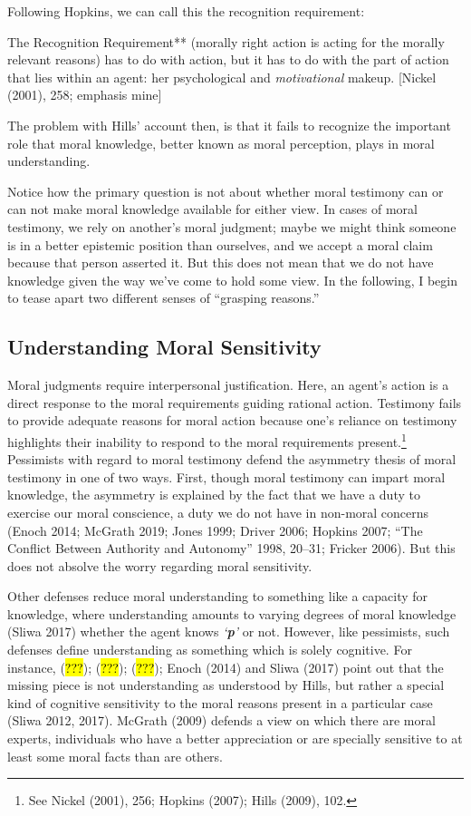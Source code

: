 \documentclass[
  letterpaper,
  DIV=11,
  numbers=noendperiod]{scrartcl}
\theoremstyle{remark}
\begin{document}
Following Hopkins, we can call this the recognition requirement:

The Recognition Requirement** (morally right action is acting for the
morally relevant reasons) has to do with action, but it has to do with
the part of action that lies within an agent: her psychological and
\emph{motivational} makeup. {[}Nickel (2001), 258; emphasis mine{]}

The problem with Hills' account then, is that it fails to recognize the
important role that moral knowledge, better known as moral perception,
plays in moral understanding.

Notice how the primary question is not about whether moral testimony can
or can not make moral knowledge available for either view. In cases of
moral testimony, we rely on another's moral judgment; maybe we might
think someone is in a better epistemic position than ourselves, and we
accept a moral claim because that person asserted it. But this does not
mean that we do not have knowledge given the way we've come to hold some
view. In the following, I begin to tease apart two different senses of
``grasping reasons.''

\subsection{Understanding Moral
Sensitivity}\label{understanding-moral-sensitivity}

Moral judgments require interpersonal justification. Here, an agent's
action is a direct response to the moral requirements guiding rational
action. Testimony fails to provide adequate reasons for moral action
because one's reliance on testimony highlights their inability to
respond to the moral requirements present.\footnote{See Nickel (2001),
  256; Hopkins (2007); Hills (2009), 102.} Pessimists with regard to
moral testimony defend the asymmetry thesis of moral testimony in one of
two ways. First, though moral testimony can impart moral knowledge, the
asymmetry is explained by the fact that we have a duty to exercise our
moral conscience, a duty we do not have in non-moral concerns (Enoch
2014; McGrath 2019; Jones 1999; Driver 2006; Hopkins 2007; ``The
Conflict Between Authority and Autonomy'' 1998, 20--31; Fricker 2006).
But this does not absolve the worry regarding moral sensitivity.

Other defenses reduce moral understanding to something like a capacity
for knowledge, where understanding amounts to varying degrees of moral
knowledge (Sliwa 2017) whether the agent knows \emph{`\textbf{p}'} or
not. However, like pessimists, such defenses define understanding as
something which is solely cognitive. For instance, (\hl{???});
(\hl{???}); (\hl{???}); Enoch (2014) and Sliwa (2017) point out that the
missing piece is not understanding as understood by Hills, but rather a
special kind of cognitive sensitivity to the moral reasons present in a
particular case (Sliwa 2012, 2017). McGrath (2009) defends a view on
which there are moral experts, individuals who have a better
appreciation or are specially sensitive to at least some moral facts
than are others.
\end{document}
